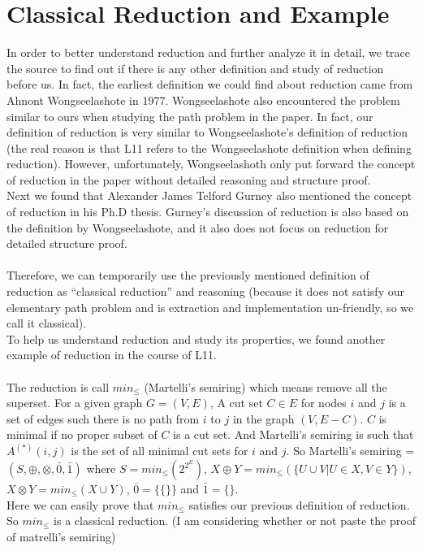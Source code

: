 \documentclass[a4paper,10pt]{article}
\begin{document}
\section{Classical Reduction and Example}
In order to better understand reduction and further analyze it in detail, we trace the source to find out if there is any other definition and study of reduction before us. 
In fact, the earliest definition we could find about reduction came from Ahnont Wongseelashote in 1977\cite{WONGSEELASHOTE197955}. Wongseelashote also encountered the problem similar to ours when studying the path problem in the paper. In fact, our definition of reduction is very similar to Wongseelashote's definition of reduction (the real reason is that L11 refers to the Wongseelashote definition when defining reduction). However, unfortunately, Wongseelashoth only put forward the concept of reduction in the paper without detailed reasoning and structure proof.\\
Next we found that Alexander James Telford Gurney also mentioned the concept of reduction in his Ph.D thesis\cite{gurney_construction_2010}. Gurney's discussion of reduction is also based on the definition by Wongseelashote, and it also does not focus on reduction for detailed structure proof.\\\\
Therefore, we can temporarily use the previously mentioned definition of reduction as “classical reduction” and reasoning (because it does not satisfy our elementary path problem and is extraction and implementation un-friendly, so we call it classical).\\
To help us understand reduction and study its properties, we found another example of reduction in the course of L11.\\\\
The reduction is call $min_{\leq}$ (Martelli’s semiring)\cite{martelli_gaussian_1976} which means remove all the superset.
For a given graph $G = (V,E)$, A cut set $C \in E$ for nodes $i$ and $j$ is a set of edges such there is no path from $i$ to $j$ in the graph $(V, E - C)$. $C$ is minimal if no proper subset of $C$ is a cut set. And Martelli’s semiring is such that $A^{(*)}(i, j)$ is the set of all minimal cut sets for $i$ and $j$. 
So Martelli’s semiring =$(S,\oplus,\otimes,\bar0,\bar1)$ where $S = min_\leq(2^{2^E})$, $X\oplus Y = min_\leq(\{U \cup V | U \in X, V \in Y\})$, $X\otimes Y = min_\leq(X \cup Y)$, $\bar0 = \{\{\}\}$ and $\bar1 = \{\}$.\\
Here we can easily prove that $min_\leq$ satisfies our previous definition of reduction. So $min_\leq$ is a classical reduction. (I am considering whether or not paste the proof of matrelli's semiring)
\end{document}
